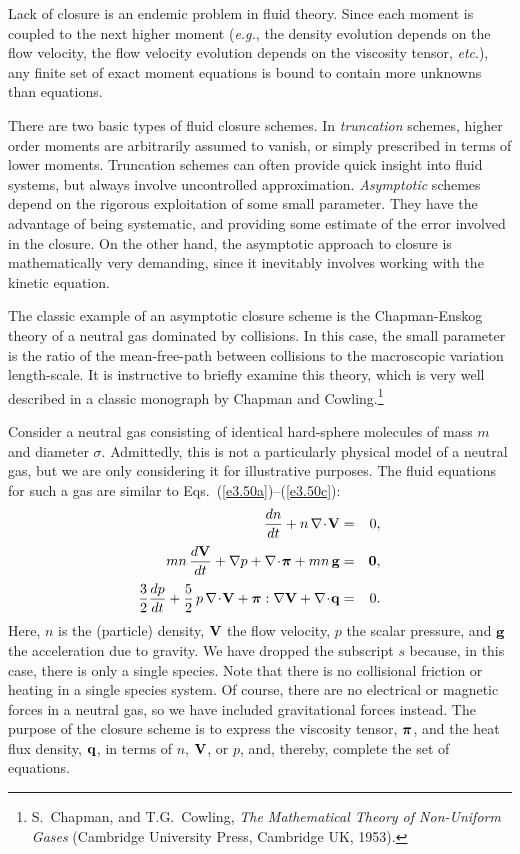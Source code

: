 Lack of closure is an endemic problem in fluid theory. Since each moment is
coupled to the next higher moment ({\em e.g.}, the density evolution depends on
the flow velocity, the flow velocity evolution depends on the viscosity
tensor, {\em etc}.), any finite set of exact moment equations is bound to
contain more unknowns than equations. 

There are two basic types of fluid closure schemes. In {\em truncation}\/ schemes,
higher order moments are arbitrarily 
assumed to vanish, or simply prescribed in terms of lower
moments. Truncation schemes can often provide quick insight into fluid
systems, but always involve uncontrolled approximation. {\em Asymptotic}\/ schemes
depend on the rigorous exploitation of some small parameter. 
They have the advantage of being systematic, and providing some
estimate of the error involved in the closure. On the other hand,
the asymptotic approach to closure is mathematically very demanding, since it
inevitably involves working with the kinetic equation.

The classic example of an asymptotic closure scheme is the Chapman-Enskog
theory of a neutral gas dominated by collisions. In this case, the small
parameter is the ratio of the mean-free-path between collisions to the
macroscopic variation length-scale. It is instructive to briefly examine this theory,
which is very well described in a classic monograph by Chapman and 
Cowling.\footnote{S.~Chapman, and T.G.~Cowling, {\em The Mathematical Theory
of Non-Uniform Gases} (Cambridge University Press, Cambridge  UK, 1953).}

Consider a neutral gas consisting of identical hard-sphere molecules of
mass $m$ and 
diameter $\sigma$. Admittedly, this is not a particularly 
physical model of a neutral gas,
 but we are only considering it for illustrative purposes. The fluid
equations for such a gas are similar to Eqs.~(\ref{e3.50a})--(\ref{e3.50c}):
\begin{eqnarray}\label{e3.56a}
\frac{dn}{dt} + n\,\nabla\!\cdot\!{\bf V} &=& 0,\\[0.5ex]
m n\,\frac{d {\bf V}}{dt} + \nabla p + \nabla\!\cdot \!\bpi + mn\,{\bf g}
& =& {\bf 0},\\[0.5ex]
\frac{3}{2}\frac{d p}{dt} + \frac{5}{2}\,p\,\nabla\!\cdot\!{\bf V}
+ \bpi:\nabla{\bf V} + \nabla\!\cdot\!{\bf q} &=& 0.\label{e3.56c}
\end{eqnarray}
Here, $n$ is the (particle) density, ${\bf V}$ the flow velocity, 
$p$ the scalar pressure,
and ${\bf g}$  the acceleration due to gravity.
We have dropped the subscript $s$ because, in this case, there is
only a single species. Note
 that there is no collisional friction or heating
in a single species system. 
Of course, there are no electrical or magnetic forces in
a neutral gas, so we have included gravitational forces instead. 
The purpose of the closure scheme is to express the
viscosity tensor, $\mbox{\boldmath$\pi$}$, and the heat flux density, ${\bf q}$, in terms
of $n$, ${\bf V}$, or $p$, and, thereby, complete the set of equations.

